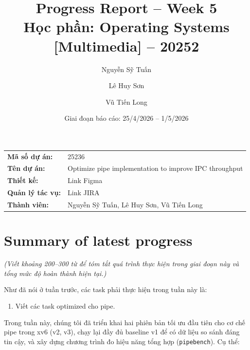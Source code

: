 \documentclass[11pt,a4paper]{article}
\title{\textbf{Progress Report -- Week 5}\\[3pt]
\large Học phần: Operating Systems [Multimedia] -- 20252}
\author{Nguyễn Sỹ Tuấn \and Lê Huy Sơn \and Vũ Tiến Long}
\date{Giai đoạn báo cáo: 25/4/2026 -- 1/5/2026}
\begin{document}
\maketitle

\begin{tabular}{@{}ll@{}}
\textbf{Mã số dự án:} & 25236 \\
\textbf{Tên dự án:} & Optimize pipe implementation to improve IPC throughput \\
\textbf{Thiết kế:} & Link Figma \\
\textbf{Quản lý tác vụ:} & Link JIRA \\
\textbf{Thành viên:} & Nguyễn Sỹ Tuấn, Lê Huy Sơn, Vũ Tiến Long \\
\end{tabular}

\hrulefill

\section{Summary of latest progress}

\textit{(Viết khoảng 200--300 từ để tóm tắt quá trình thực hiện trong giai đoạn này và tổng mức độ hoàn thành hiện tại.)}

Như đã nói ở tuần trước, các task phải thực hiện trong tuần này là:

\begin{enumerate}
  \item Viết các task optimized cho pipe.
\end{enumerate}

Trong tuần này, chúng tôi đã triển khai hai phiên bản tối ưu đầu tiên cho cơ chế pipe trong xv6 (v2, v3), chạy lại đầy đủ baseline v1 để có dữ liệu so sánh đáng tin cậy, và xây dựng chương trình đo hiệu năng tổng hợp (\texttt{pipebench}). Cụ thể:
\end{document}
